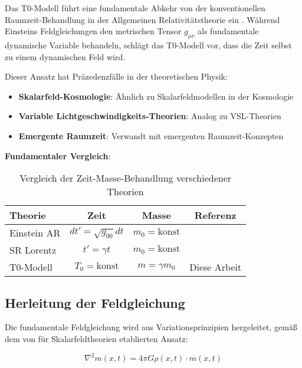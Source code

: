 \documentclass[12pt,a4paper]{article}
\begin{document}
	Das T0-Modell führt eine fundamentale Abkehr von der konventionellen Raumzeit-Behandlung in der Allgemeinen Relativitätstheorie ein \citep{einstein1915,misner1973,weinberg1972}. Während Einsteins Feldgleichungen den metrischen Tensor $g_{\mu\nu}$ als fundamentale dynamische Variable behandeln, schlägt das T0-Modell vor, dass die Zeit selbst zu einem dynamischen Feld wird.
	
	Dieser Ansatz hat Präzedenzfälle in der theoretischen Physik:
	\begin{itemize}
		\item \textbf{Skalarfeld-Kosmologie}: Ähnlich zu Skalarfeldmodellen in der Kosmologie \citep{weinberg2008,peebles1993}
		\item \textbf{Variable Lichtgeschwindigkeits-Theorien}: Analog zu VSL-Theorien \citep{barrow1999,albrecht1999}
		\item \textbf{Emergente Raumzeit}: Verwandt mit emergenten Raumzeit-Konzepten \citep{jacobson1995,verlinde2011}
	\end{itemize}
	
	\textbf{Fundamentaler Vergleich}:
	\begin{table}[htbp]
		\centering
		\begin{tabular}{|l|c|c|c|}
			\hline
			\textbf{Theorie} & \textbf{Zeit} & \textbf{Masse} & \textbf{Referenz} \\
			\hline
			Einstein AR & $dt' = \sqrt{g_{00}} dt$ & $m_0 = \text{konst}$ & \citep{einstein1915,misner1973} \\
			SR Lorentz & $t' = \gamma t$ & $m_0 = \text{konst}$ & \citep{einstein1905,jackson1998} \\
			T0-Modell & $T_0 = \text{konst}$ & $m = \gamma m_0$ & Diese Arbeit \\
			\hline
		\end{tabular}
		\caption{Vergleich der Zeit-Masse-Behandlung verschiedener Theorien}
		\label{tab:theory_comparison}
	\end{table}
	
	\subsection{Herleitung der Feldgleichung}
	\label{subsec:field_equation_derivation}
	
	Die fundamentale Feldgleichung wird aus Variationsprinzipien hergeleitet, gemäß dem von \citet{weinberg1995} für Skalarfeldtheorien etablierten Ansatz:
	
	\begin{equation}
		\label{eq:field_equation_fundamental}
		\nabla^2 m(x,t) = 4\pi G \rho(x,t) \cdot m(x,t)
	\end{equation}
	
\end{document}
